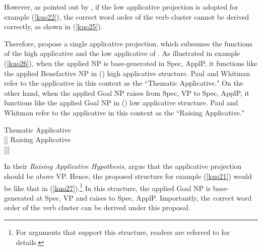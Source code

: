 \documentclass[output=paper,colorlinks,citecolor=brown]{langscibook}
\begin{document}
\ea
    \label{kuo24}
    \z
\z

However, as pointed out by \citet{Paul&Whitman2010}, if the low applicative projection is adopted for example (\ref{kuo22}), the correct word order of the verb cluster cannot be derived correctly, as shown in (\ref{kuo25}).

\z

Therefore, \citet{Paul&Whitman2010} propose a single applicative projection, which subsumes the functions of the high applicative and the low applicative of \citet{Pylkkanen2002, Pylkkanen2008}. As illustrated in example (\ref{kuo26}), when the applied NP is base-generated in Spec, ApplP, it functions like the applied Benefactive NP in  (\citeyear{Pylkkanen2002, Pylkkanen2008}) high applicative structure. Paul and Whitman refer to the applicative in this context as the “Thematic Applicative." On the other hand, when the applied Goal NP raises from Spec, VP to Spec, ApplP, it functions like the applied Goal NP in  (\citeyear{Pylkkanen2002, Pylkkanen2008}) low applicative structure. Paul and Whitman refer to the applicative in this context as the “Raising Applicative."

\ea
\label{kuo26}
    \ea
        \glt Thematic Applicative\\
        \glt [{\scriptsize APPLP} DP{\tiny Benefactive} [{\scriptsize APPL'} Appl [{\scriptsize VP} V DP]]]
    \ex
        \glt Raising Applicative\\
        \glt [{\scriptsize APPLP} DP{\tiny Goal} [{\scriptsize APPL'} Appl [{\scriptsize VP} t{\tiny Goal} [{\scriptsize V'} V DP{\tiny Theme} ]]]]
    \z
\z

In their \textit{Raising Applicative Hypothesis}, \citet{Paul&Whitman2010} argue that the applicative projection should be above VP. Hence, the proposed structure for example (\ref{kuo21}) would be like that in (\ref{kuo27}).\footnote{For arguments that support this structure, readers are referred to \citet{Paul&Whitman2010} for details.} In this structure, the applied Goal NP is base-generated at Spec, VP and raises to Spec, ApplP. Importantly, the correct word order of the verb cluster can be derived under this proposal.
\end{document}
